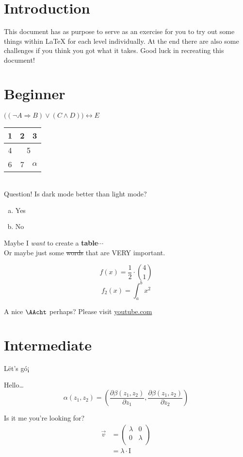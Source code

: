 \documentclass[hidelinks]{article}
\begin{document}
\section*{Introduction}
This document has as purpose to serve as an exercise for you to try out some things within \LaTeX\; for each level individually. At the end there are also some challenges if you think you got what it takes. Good luck in recreating this document!

\clearpage

\section*{Beginner}
$\Big((\neg A\Rightarrow B) \vee (C \wedge D)\Big) \leftrightarrow E $

\begin{tabular}{| c c c |}
1 & 2 & 3\\
\hline
4 & \multicolumn{2}{c|}{5} \\
6 & 7 & $\alpha$
\end{tabular}\\

Question! Is dark mode better than light mode?
\begin{enumerate}[a)]
	\item Yes
	\item No
\end{enumerate}

Maybe I \textit{want} to create a \textbf{table}$\cdots$\\

Or maybe \qquad just \qquad some \st{words} that are {\Huge VERY} important.

\[f(x) = \frac{1}{2}\cdot\binom{4}{1}\]
\[f_{2}(x) = \int_{a}^{b}x^2\]

A nice $\AAcht$ perhaps? Please visit \url{youtube.com}

\clearpage

\section*{Intermediate}
L\"{e}t's g\'{o}¡\\[5mm]
\begin{minipage}{0.5\textwidth}
Hello\dots
\begin{equation*}
	\alpha(z_{1}, z_{2}) = \left(\dfrac{\partial\beta(z_{1}, z_{2})}{\partial z_{1}}, \dfrac{\partial\beta(z_{1}, z_{2})}{\partial z_{2}}\right)
\end{equation*}
\end{minipage}
\begin{minipage}{0.5\textwidth}
Is it me you're looking for?
\begin{align*}
\vec{v} &= 
\begin{pmatrix}
	\lambda & 0 \\
	0 & \lambda \\
\end{pmatrix}
\\
&= \lambda\cdot \text{I}
\end{align*}
\end{minipage}
\end{document}

